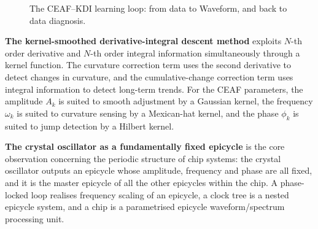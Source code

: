 \begin{figure}[htbp]
\centering
{}
\caption{The CEAF--KDI learning loop: from data to Waveform, and back to data diagnosis.}
\label{fig:closing_ceaf_kdi_loop}
\end{figure}

\textbf{The kernel-smoothed derivative-integral descent method} exploits $N$-th order derivative and $N$-th order integral information simultaneously through a kernel function. The curvature correction term uses the second derivative to detect changes in curvature, and the cumulative-change correction term uses integral information to detect long-term trends. For the CEAF parameters, the amplitude $A_k$ is suited to smooth adjustment by a Gaussian kernel, the frequency $\omega_k$ is suited to curvature sensing by a Mexican-hat kernel, and the phase $\phi_k$ is suited to jump detection by a Hilbert kernel.

\textbf{The crystal oscillator as a fundamentally fixed epicycle} is the core observation concerning the periodic structure of chip systems: the crystal oscillator outputs an epicycle whose amplitude, frequency and phase are all fixed, and it is the master epicycle of all the other epicycles within the chip. A phase-locked loop realises frequency scaling of an epicycle, a clock tree is a nested epicycle system, and a chip is a parametrised epicycle waveform/spectrum processing unit.

